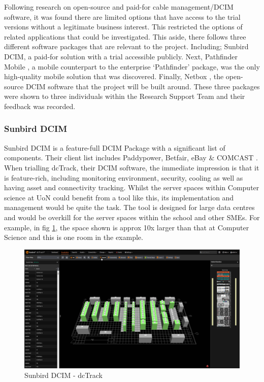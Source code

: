 \documentclass [11pt,a4paper]{article}
\begin{document}
Following research on open-source and paid-for cable management/DCIM software, it was found there are limited options that have access to the trial versions without a legitimate business interest. This restricted the options of related applications that could be investigated. This aside, there follows three different software packages that are relevant to the project. Including; Sunbird DCIM\cite{Sunbird}, a paid-for solution with a trial accessible publicly. Next, Pathfinder Mobile \cite{Pathfinder}, a mobile counterpart to the enterprise `Pathfinder' package, was the only high-quality mobile solution that was discovered. Finally, Netbox \cite{Netbox}, the open-source DCIM software that the project will be built around. These three packages were shown to three individuals within the Research Support Team and their feedback was recorded.

\subsubsection{Sunbird DCIM}
\label{sec:sunbird}
Sunbird DCIM is a feature-full DCIM Package with a significant list of components. Their client list includes Paddypower, Betfair, eBay \& COMCAST \cite{Sunbird-we-know-data-centres}. When trialling dcTrack, their DCIM software, the immediate impression is that it is feature-rich, including monitoring environment, security, cooling as well as having asset and connectivity tracking. Whilst the server spaces within Computer science at UoN could benefit from a tool like this, its implementation and management would be quite the task. The tool is designed for large data centres and would be overkill for the server spaces within the school and other SMEs. For example, in fig \ref{fig:sunbird_dcTrack}, the space shown is approx 10x larger than that at Computer Science and this is one room in the example. 

\begin{figure}[H]
    \centering
    \includegraphics[width=0.7\linewidth]{images/sunbirddcim.png}
    \caption{Sunbird DCIM - dcTrack}
    \label{fig:sunbird_dcTrack}
\end{figure}
\end{document}
